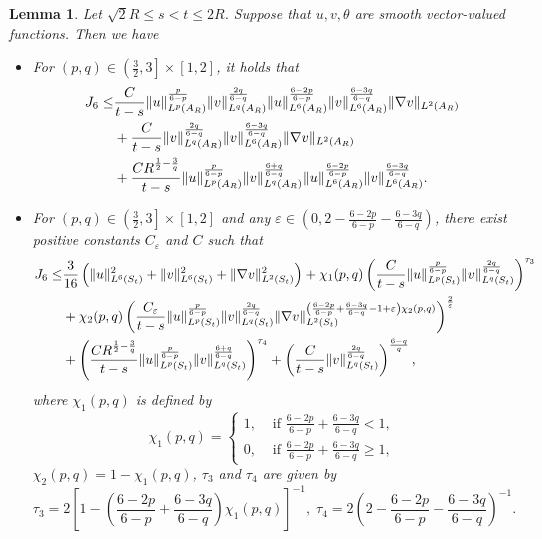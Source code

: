 \documentclass[11pt,reqno]{amsart}
\newtheorem{Lem}{Lemma}[section]
\numberwithin{Thm}{section}
\begin{document}
\begin{Lem}\label{Lem3.7}
	Let $\sqrt{2}R\leq s<t\leq 2R$.
	Suppose that $u,v,\theta$ are smooth vector-valued functions. Then we have
\begin{itemize}
\item[(i)] For $(p,q)\in\left(\frac{3}{2},3\right]\times [1,2]$, it holds that
\begin{align}
	J_6 \leq&\frac{C}{t-s}\|u\|_{L^p(A_R)}^{\frac{p}{6-p}}\|v\|_{L^q(A_R)}^{\frac{2q}{6-q}} \|u\|_{L^6(A_R)}^{\frac{6-2p}{6-p}}  \|v\|_{L^6(A_R)}^{\frac{6-3q}{6-q}}\|\nabla v\|_{L^2(A_R)}\notag\\
	&+\frac{C}{t-s}\|v\|_{L^q(A_R)}^{\frac{2q}{6-q}} \|v\|_{L^6(A_R)}^{\frac{6-3q}{6-q}}\|\nabla v\|_{L^2(A_R)}\label{ine3.26a}\\
	&+\frac{C R^{\frac{1}{2}-\frac{3}{q}}}{t-s} \|u\|_{L^p(A_R)}^{\frac{p}{6-p}}\|v\|_{L^q(A_R)}^{\frac{6+q}{6-q}}\|u\|_{L^6(A_R)}^{\frac{6-2p}{6-p}} \|v\|_{L^6(A_R)}^{\frac{6-3q}{6-q}}.\notag
\end{align}
		\item[(ii)] For $(p,q)\in\left(\frac{3}{2},3\right]\times [1,2]$ and any $\varepsilon\in\left(0,2-\frac{6-2p}{6-p}-\frac{6-3q}{6-q}\right)$, there exist positive constants $C_\varepsilon$ and $C$ such that
		\begin{align}
				J_{6} \leq& \frac{3}{16}\left(\|u\|_{L^6(S_t)}^2 + \|v\|_{L^6(S_t)}^2 + \|\nabla v\|_{L^2(S_t)}^2\right)
				+\chi_1(p,q)\left(\frac{C}{t-s}\|u\|_{L^p(S_t)}^{\frac{p}{6-p}} \|v\|_{L^q(S_t)}^{\frac{2q}{6-q}}\right)^{\tau_3}\notag\\
&+\chi_2(p,q)\left( \frac{C_\varepsilon}{t-s}\|u\|_{L^p(S_t)}^{\frac{p}{6-p}} \|v\|_{L^q(S_t)}^{\frac{2q}{6-q}} \|\nabla v\|_{L^2(S_t)}^{\left(\frac{6-2p}{6-p}+\frac{6-3q}{6-q}-1+\varepsilon\right)\chi_2(p,q)} \right)^{\frac{2}{\varepsilon}}\label{ine3.27a}\\
				&+\left( \frac{C R^{\frac{1}{2}-\frac{3}{q}}}{t-s} \|u\|_{L^p(S_t)}^{\frac{p}{6-p}} \|v\|_{L^q(S_t)}^{\frac{6+q}{6-q}} \right)^{\tau_4}+ \left( \frac{C}{t-s}  \|v\|_{L^q(S_t)}^{\frac{2q}{6-q}} \right)^{\frac{6-q}{q}},\notag
		\end{align}
where $\chi_1(p,q)$ is defined by
\begin{equation*}
	\chi_1(p,q)=
	\begin{cases}
		1, & \text{ if  }\frac{6-2p}{6-p} + \frac{6-3q}{6-q} < 1, \\
		0, & \text{ if  }\frac{6-2p}{6-p} + \frac{6-3q}{6-q} \geq 1,
	\end{cases}
\end{equation*}
$\chi_2(p,q)=1-\chi_1(p,q)$, $\tau_3$ and $\tau_4$ are given by
$$
\tau_3=2\left[1-\left(\frac{6-2p}{6-p}+ \frac{6-3q}{6-q}\right)\chi_1(p,q)\right]^{-1},\;\tau_4=2\left(2-\frac{6-2p}{6-p} - \frac{6-3q}{6-q}\right)^{-1}.
$$
\end{itemize}
	
\end{Lem}
\end{document}
